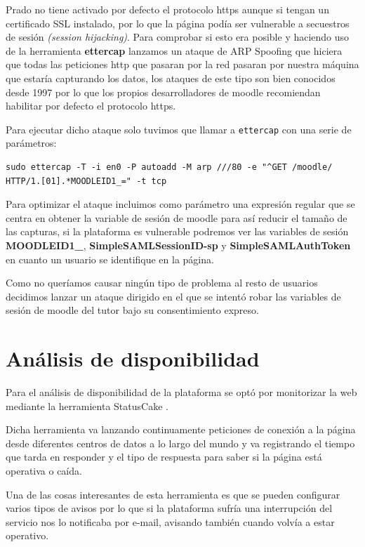 \bigskip
Prado no tiene activado por defecto el protocolo https aunque si tengan un certificado SSL instalado, por lo que la página podía ser vulnerable a secuestros de sesión \textit{(session hijacking)}. Para comprobar si esto era posible y haciendo uso de la herramienta \textbf{ettercap} lanzamos un ataque de ARP Spoofing\cite{art_08} que hiciera que todas las peticiones http que pasaran por la red pasaran por nuestra máquina que estaría capturando los datos, los ataques de este tipo son bien conocidos desde 1997\cite{art_07} por lo que los propios desarrolladores de moodle recomiendan habilitar por defecto el protocolo https\cite{art_10}.

\bigskip
Para ejecutar dicho ataque solo tuvimos que llamar a \texttt{ettercap} con una serie de parámetros:

\begin{lstlisting}
sudo ettercap -T -i en0 -P autoadd -M arp ///80 -e "^GET /moodle/ HTTP/1.[01].*MOODLEID1_=" -t tcp
\end{lstlisting}

Para optimizar el ataque incluimos como parámetro una expresión regular que se centra en obtener la variable de sesión de moodle para así reducir el tamaño de las capturas, si la plataforma es vulnerable podremos ver las variables de sesión \textbf{MOODLEID1\_}, \textbf{SimpleSAMLSessionID-sp} y \textbf{SimpleSAMLAuthToken} en cuanto un usuario se identifique en la página.

\bigskip
Como no queríamos causar ningún tipo de problema al resto de usuarios decidimos lanzar un ataque dirigido en el que se intentó robar las variables de sesión de moodle del tutor bajo su consentimiento expreso.

\section{Análisis de disponibilidad}

Para el análisis de  disponibilidad de la plataforma se optó por monitorizar la web mediante la herramienta StatusCake \cite{statuscake}.

\bigskip
Dicha herramienta va lanzando continuamente peticiones de conexión a la página desde diferentes centros de datos a lo largo del mundo y va registrando el tiempo que tarda en responder y el tipo de respuesta para saber si la página está operativa o caída.

\bigskip
Una de las cosas interesantes de esta herramienta es que se pueden configurar varios tipos de avisos por lo que si la plataforma sufría una interrupción del servicio nos lo notificaba por e-mail, avisando también cuando volvía a estar operativo.



